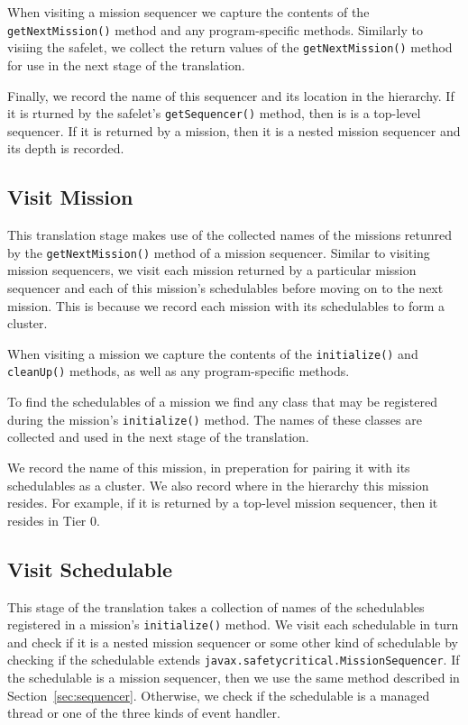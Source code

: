\documentclass[10pt,a4paper]{article}
\begin{document}
When visiting a mission sequencer we capture the contents of the \texttt{getNextMission()} method and any program-specific methods. Similarly to visiing the safelet, we collect the return values of the \texttt{getNextMission()} method for use in the next stage of the translation. 

Finally, we record the name of this sequencer and its location in the hierarchy. If it is rturned by the safelet's \texttt{getSequencer()} method, then is is a top-level sequencer. If it is returned by a mission, then it is a nested mission sequencer and its depth is recorded.

\subsection{Visit Mission}

This translation stage makes use of the collected names of the missions retunred by the \texttt{getNextMission()} method of a mission sequencer. Similar to visiting mission sequencers, we visit each mission returned by a particular mission sequencer and each of this mission's schedulables before moving on to the next mission. This is because we record each mission with its schedulables to form a cluster. 

When visiting a mission we capture the contents of the \texttt{initialize()} and \texttt{cleanUp()} methods, as well as any program-specific methods. 

To find the schedulables of a mission we find any class that may be registered during the mission's \texttt{initialize()} method. The names of these classes are collected and used in the next stage of the translation. 

We record the name of this mission, in preperation for pairing it with its schedulables as a cluster. We also record where in the hierarchy this mission resides. For example, if it is returned by a top-level mission sequencer, then it resides in Tier 0. 


\subsection{Visit Schedulable}
\label{sec:schedulables}

This stage of the translation takes a collection of names of the schedulables registered in a mission's \texttt{initialize()} method. We visit each schedulable in turn and check if it is a nested mission sequencer or some other kind of schedulable by checking if the schedulable extends \texttt{javax.safetycritical.MissionSequencer}. If the schedulable is a mission sequencer, then we use the same method described in Section~\ref{sec:sequencer}. Otherwise, we check if the schedulable is a managed thread or one of the three kinds of event handler.
\end{document}
